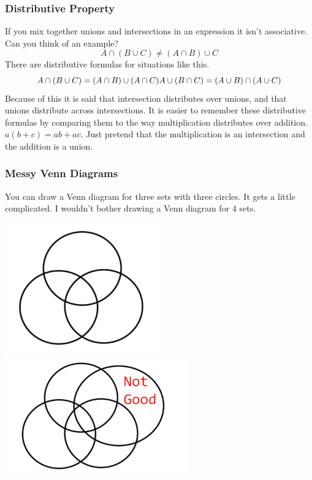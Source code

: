 \documentclass[
]{book}
\theoremstyle{definition}
\theoremstyle{definition}
\theoremstyle{definition}
\theoremstyle{remark}
\begin{document}
\hypertarget{distributive-property}{%
\subsubsection{Distributive Property}\label{distributive-property}}

If you mix together unions and intersections in an expression it isn't associative. Can you think of an example?
\[A \cap (B \cup C) \not= (A \cap B) \cup C\]
There are distributive formulas for situations like this.
\[A \cap (B \cup C) = (A \cap B) \cup (A \cap C) \\
 A \cup (B \cap C) = (A \cup B) \cap (A \cup C)\]
Because of this it is said that intersection distributes over unions, and that unions distribute across intersections. It is easier to remember these distributive formulas by comparing them to the way multiplication distributes over addition. \(a(b+c)=ab+ac\). Just pretend that the multiplication is an intersection and the addition is a union.

\hypertarget{messy-venn-diagrams}{%
\subsubsection{Messy Venn Diagrams}\label{messy-venn-diagrams}}

You can draw a Venn diagram for three sets with three circles. It gets a little complicated. I wouldn't bother drawing a Venn diagram for 4 sets.

\includegraphics{Pictures/01-Sets/Venn3.PNG}
\includegraphics{Pictures/01-Sets/Venn4.PNG}
\end{document}
